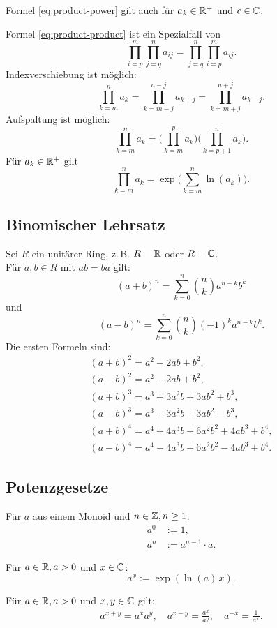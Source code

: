 Formel \eqref{eq:product-power} gilt auch für $a_k\in\mathbb R^+$ und $c\in\mathbb C$.

Formel \eqref{eq:product-product} ist ein Spezialfall von
\begin{equation}
\prod_{i=p}^m \prod_{j=q}^n a_{ij} = \prod_{j=q}^n \prod_{i=p}^m a_{ij}.
\end{equation}
Indexverschiebung ist möglich:
\begin{equation}
\prod_{k=m}^n a_k = \prod_{k=m-j}^{n-j} a_{k+j} = \prod_{k=m+j}^{n+j} a_{k-j}.
\end{equation}
Aufspaltung ist möglich:
\begin{equation}
\prod_{k=m}^n a_k = \bigg(\prod_{k=m}^p a_k\bigg)\bigg(\prod_{k=p+1}^n a_k\bigg).
\end{equation}
Für $a_k\in\mathbb R^+$ gilt
\begin{equation}
\prod_{k=m}^n a_k = \exp\bigg(\sum_{k=m}^n \ln(a_k)\bigg).
\end{equation}

\subsection{Binomischer Lehrsatz}
Sei $R$ ein unitärer Ring, z.\,B. $R=\mathbb R$ oder $R=\mathbb C$.\\
Für $a,b\in R$ mit $ab=ba$ gilt:%
\begin{equation}
(a+b)^n = \sum_{k=0}^n \binom{n}{k} a^{n-k} b^k
\end{equation}
und
\begin{equation}
(a-b)^n = \sum_{k=0}^n \binom{n}{k} (-1)^k a^{n-k} b^k.
\end{equation}
Die ersten Formeln sind:
\begin{gather}
(a+b)^2 = a^2+2ab+b^2,\\
(a-b)^2 = a^2-2ab+b^2,\\
(a+b)^3 = a^3+3a^2 b+3ab^2+b^3,\\
(a-b)^3 = a^3-3a^2 b+3ab^2-b^3,\\
(a+b)^4 = a^4+4a^3 b+6a^2 b^2+4ab^3+b^4,\\
(a-b)^4 = a^4-4a^3 b+6a^2 b^2-4ab^3+b^4.
\end{gather}
\subsection{Potenzgesetze}
\begin{definition}[Potenz]
Für $a$ aus einem Monoid und $n\in\mathbb Z,n\ge 1$:
\begin{align}
a^0 &:= 1,\\
a^n &:= a^{n-1}\cdot a.
\end{align}

Für $a\in\mathbb R, a>0$ und $x\in\mathbb C$:
\begin{equation}
a^x := \exp(\ln(a)\,x).
\end{equation}
\end{definition}
\noindent
Für $a\in\mathbb R, a>0$ und $x,y\in\mathbb C$ gilt:
\begin{gather}
a^{x+y} = a^x a^y,\quad a^{x-y} = \frac{a^x}{a^y},
\quad a^{-x} = \frac{1}{a^x}.
\end{gather}

